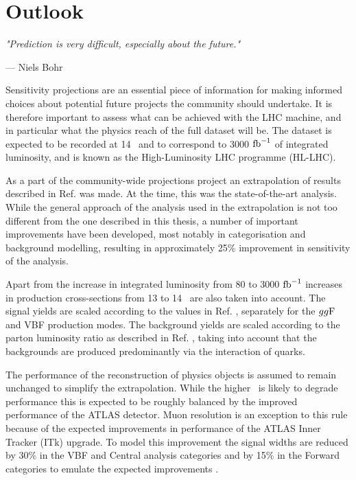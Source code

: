 \chapter{Outlook}

\textit{"Prediction is very difficult, especially about the future."}

\vspace{5mm}
\begin{flushright}
--- Niels Bohr
\end{flushright}

\thispagestyle{empty}

\newpage

Sensitivity projections are an essential piece of information for
making informed choices about potential future projects the community
should undertake.
It is therefore important to assess what can be achieved with the LHC
machine, and in particular what the physics reach of the full dataset
will be. The dataset is expected to be recorded at 14 \TeV~and to
correspond to 3000 $\text{fb}^{-1}$ of integrated luminosity, and is known
as the High-Luminosity LHC programme (HL-LHC).

As a part of the community-wide projections project \cite{ATL-PHYS-PUB-2018-054, Cepeda:2019klc}
an extrapolation of results described in Ref. \cite{ATLAS-CONF-2018-026}
was made. At the time, this was the state-of-the-art analysis.
While the general approach of the analysis used in the extrapolation
is not too different from the one described in this thesis, a number
of important improvements have been developed, most notably in categorisation
and background modelling, resulting in approximately 25\% improvement
in sensitivity of the analysis.

Apart from the increase in integrated luminosity from 80 to 3000 $\text{fb}^{-1}$
increases in production cross-sections from 13 to 14 \TeV~are also
taken into account. The signal yields are scaled according to the
values in Ref. \cite{deFlorian:2016spz}, separately for the $gg\text{F}$
and VBF production modes. The background yields are scaled according
to the parton luminosity ratio as described in Ref. \cite{Heinemeyer:2013tqa},
taking into account that the backgrounds are produced predominantly via
the interaction of quarks.

The performance of the reconstruction of physics objects is assumed
to remain unchanged to simplify the extrapolation. While the higher
\pileup~is likely to degrade performance this is expected to be
roughly balanced by the improved performance of the ATLAS detector.
Muon resolution is an exception to this rule because of the
expected improvements in performance of the ATLAS Inner Tracker (ITk)
upgrade. To model this improvement the signal widths are reduced 
by 30\% in the VBF and Central analysis categories and by 15\% in
the Forward categories to emulate the expected improvements
\cite{Collaboration:2285585}.

